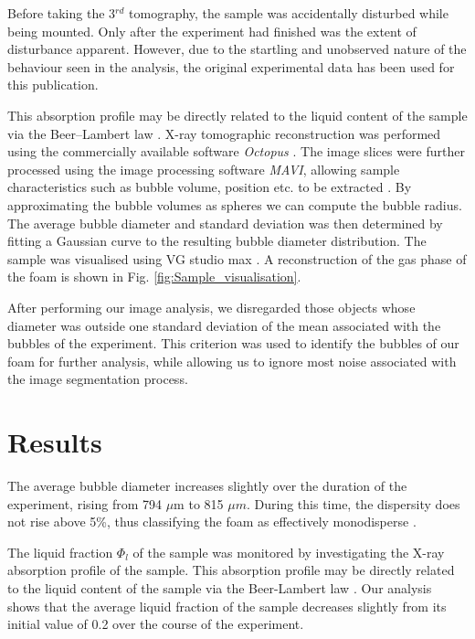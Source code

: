 \documentclass[10pt,a4paper]{article}
\begin{document}
Before taking the 3$^{rd}$ tomography, the sample was accidentally disturbed while being mounted. Only after the experiment had finished was the extent of disturbance apparent. However, due to the startling and unobserved nature of the behaviour seen in the analysis, the original experimental data has been used for this publication. 

This absorption profile may be directly related to the liquid content of the sample via the Beer–Lambert law \cite{Garcia2013}. 
X-ray tomographic reconstruction was performed using the commercially available software \emph{Octopus} \cite{Octopus_reference}. The image slices were further processed using the image processing software \emph{MAVI}, allowing sample characteristics such as bubble volume, position etc. to be extracted \cite{MAVI}. By approximating the bubble volumes as spheres we can compute the bubble radius. The average bubble diameter and standard deviation was then determined by fitting a Gaussian curve to the resulting bubble diameter distribution. The sample was visualised using VG studio max \cite{website:VGstudiomax}. A reconstruction of the gas phase of the foam is shown in Fig. \ref{fig:Sample_visualisation}.

After performing our image analysis, we disregarded those objects whose diameter was outside one standard deviation of the mean associated with the bubbles of the experiment. This criterion was used to identify the bubbles of our foam for further analysis, while allowing us to ignore most noise associated with the image segmentation process.

\section{Results}
\label{sec:results}

The average bubble diameter increases slightly over the duration of the experiment, rising from 794 $\mu$m to 815 $\mu m$. During this time, the dispersity does not rise above 5\%, thus classifying the foam as effectively monodisperse \cite{HohlerEtal08}.

The liquid fraction $\Phi_l$ of the sample was monitored by investigating the X-ray absorption profile of the sample. This absorption profile may be directly related to the liquid content of the sample via the Beer-Lambert law \cite{Garcia2013}. Our analysis shows that the average liquid fraction of the sample decreases slightly from its initial value of 0.2 over the course of the experiment. 
 
\end{document}
